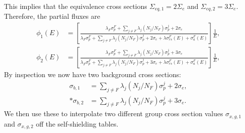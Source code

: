 This implies that the equivalence cross sections $\Sigma_{eq,1} = 2 \Sigma_e$ and $\Sigma_{eq,2} = 3 \Sigma_e$. Therefore, the partial fluxes are
\begin{subequations}
\begin{align}
  \phi_1(E) &= \left[ \frac{ \lambda_F \sigma_p^F + \displaystyle\sum_{j \ne F} \lambda_j ( N_j / N_F ) \sigma_p^j + 2 \sigma_e }{ \lambda_F \sigma_p^F + \displaystyle\sum_{j \ne F} \lambda_j ( N_j / N_F ) \sigma_p^j + 2 \sigma_e + \lambda \sigma_{rs}^F(E) +  \sigma_a^F(E) } \right] \frac{1}{E} , \\
  \phi_2(E) &= \left[ \frac{ \lambda_F \sigma_p^F + \displaystyle\sum_{j \ne F} \lambda_j ( N_j / N_F ) \sigma_p^j + 3 \sigma_e }{ \lambda_F \sigma_p^F + \displaystyle\sum_{j \ne F} \lambda_j ( N_j / N_F ) \sigma_p^j + 3 \sigma_e + \lambda \sigma_{rs}^F(E) +  \sigma_a^F(E) } \right] \frac{1}{E} ,  
\end{align}
\end{subequations}
By inspection we now have two background cross sections:
\begin{subequations}
\begin{align}
  \sigma_{b,1} &=  \displaystyle\sum_{j \ne F} \lambda_j ( N_j / N_F ) \sigma_p^j + 2 \sigma_e, \\*
  \sigma_{b,2} &=  \displaystyle\sum_{j \ne F} \lambda_j ( N_j / N_F ) \sigma_p^j + 3 \sigma_e.
\end{align}
\end{subequations}
We then use these to interpolate two different group cross section values $\sigma_{x,g,1}$ and $\sigma_{x,g,2}$ off the self-shielding tables.

